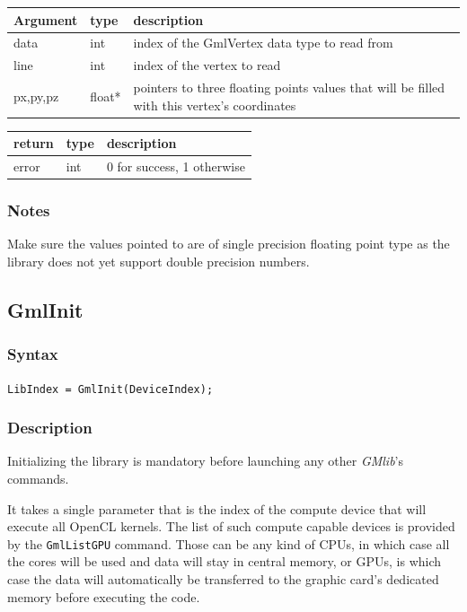 \documentclass[a4paper,12pt]{article}
\begin{document}
\begin{tabular}{|m{2cm}|m{1.5cm}|m{10.5cm}|}
\hline
Argument   & type   & description \\
\hline
data       & int    & index of the GmlVertex data type to read from \\
\hline
line       & int    & index of the vertex to read \\
\hline
px,py,pz   & float* & pointers to three floating points values that will be filled with this vertex's coordinates \\
\hline
\end{tabular}

\medskip

\begin{tabular}{|m{2cm}|m{1.5cm}|m{10.5cm}|}
\hline
return     & type   & description \\
\hline
error     & int    & 0 for success, 1 otherwise \\
\hline
\end{tabular}
\subsubsection*{Notes}
Make sure the values pointed to are of single precision floating point type as the library does not yet support double precision numbers.


\subsection{GmlInit}
\subsubsection*{Syntax}
{\tt LibIndex = GmlInit(DeviceIndex);}

\subsubsection*{Description}

Initializing the library is mandatory before launching any other \emph{GMlib}'s commands.

It takes a single parameter that is the index of the compute device that will execute all OpenCL kernels. The list of such compute capable devices is provided by the {\tt GmlListGPU} command. Those can be any kind of CPUs, in which case all the cores will be used and data will stay in central memory, or GPUs, is which case the data will automatically be transferred to the graphic card's dedicated memory before executing the code.
\end{document}
